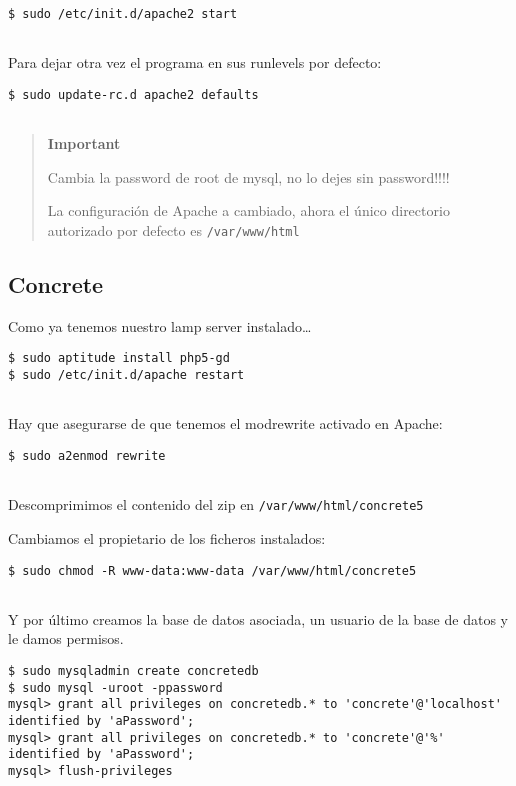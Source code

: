 \begin{verbatim}
$ sudo /etc/init.d/apache2 start
      
\end{verbatim}

Para dejar otra vez el programa en sus runlevels por defecto:

\begin{verbatim}
$ sudo update-rc.d apache2 defaults
      
\end{verbatim}

\begin{quote}
\textbf{Important}

Cambia la password de root de mysql, no lo dejes sin password!!!!

La configuración de Apache a cambiado, ahora el único directorio
autorizado por defecto es \texttt{/var/www/html}
\end{quote}

\subsection{Concrete}\label{concrete}

Como ya tenemos nuestro lamp server instalado\ldots{}

\begin{verbatim}
$ sudo aptitude install php5-gd
$ sudo /etc/init.d/apache restart
      
\end{verbatim}

Hay que asegurarse de que tenemos el modrewrite activado en Apache:

\begin{verbatim}
$ sudo a2enmod rewrite
      
\end{verbatim}

Descomprimimos el contenido del zip en \texttt{/var/www/html/concrete5}

Cambiamos el propietario de los ficheros instalados:

\begin{verbatim}
$ sudo chmod -R www-data:www-data /var/www/html/concrete5
      
\end{verbatim}

Y por último creamos la base de datos asociada, un usuario de la base de
datos y le damos permisos.

\begin{verbatim}
$ sudo mysqladmin create concretedb
$ sudo mysql -uroot -ppassword
mysql> grant all privileges on concretedb.* to 'concrete'@'localhost' identified by 'aPassword';
mysql> grant all privileges on concretedb.* to 'concrete'@'%' identified by 'aPassword';
mysql> flush-privileges
      
\end{verbatim}

